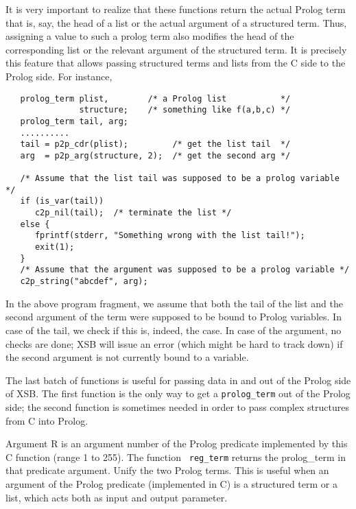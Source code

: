It is very important to realize that these functions return the actual
Prolog term that is, say, the head of a list or the actual argument of a
structured term. Thus, assigning a value to such a prolog term also
modifies the head of the corresponding list or the relevant argument of the
structured term. It is precisely this feature that allows passing
structured terms and lists from the C side to the Prolog side.
For instance, 
\begin{verbatim}
   prolog_term plist,        /* a Prolog list           */
               structure;    /* something like f(a,b,c) */
   prolog_term tail, arg;
   ..........
   tail = p2p_cdr(plist);         /* get the list tail  */
   arg  = p2p_arg(structure, 2);  /* get the second arg */

   /* Assume that the list tail was supposed to be a prolog variable */
   if (is_var(tail))
      c2p_nil(tail);  /* terminate the list */
   else {
      fprintf(stderr, "Something wrong with the list tail!");
      exit(1);
   }
   /* Assume that the argument was supposed to be a prolog variable */
   c2p_string("abcdef", arg);
\end{verbatim}

In the above program fragment, we assume that both the tail of the list and
the second argument of the term were supposed to be bound to Prolog variables.
In case of the tail, we check if this is, indeed, the case. In case of the
argument, no checks are done; XSB will issue an error (which might be hard
to track down) if the second argument is not currently bound to a variable.

The last batch of functions is useful for passing data in and out of the
Prolog side of XSB. The first function is the only way to get a
{\tt prolog\_term} out of the Prolog side; the second function is
sometimes needed in order to pass complex structures from C into Prolog.
\begin{description}
   
    Argument R is an argument number of the Prolog predicate implemented by
    this C function (range 1 to 255). The function {\tt
    reg\_term} returns the prolog\_term in that predicate argument.
    Unify the two Prolog terms. This is useful when an argument of the
    Prolog predicate (implemented in C) is a structured term or a list,
    which acts both as input and output parameter.
\end{description}

